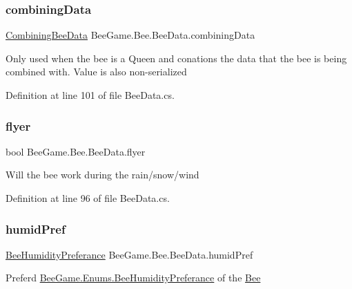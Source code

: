 \subsubsection{\texorpdfstring{combining\+Data}{combiningData}}
{\footnotesize\ttfamily \hyperlink{struct_bee_game_1_1_bee_1_1_combining_bee_data}{Combining\+Bee\+Data} Bee\+Game.\+Bee.\+Bee\+Data.\+combining\+Data}



Only used when the bee is a Queen and conations the data that the bee is being combined with. Value is also non-\/serialized 



Definition at line 101 of file Bee\+Data.\+cs.

\mbox{\label{struct_bee_game_1_1_bee_1_1_bee_data_af78a352321613693c3e94c98f655ac63}} 
\subsubsection{\texorpdfstring{flyer}{flyer}}
{\footnotesize\ttfamily bool Bee\+Game.\+Bee.\+Bee\+Data.\+flyer}



Will the bee work during the rain/snow/wind 



Definition at line 96 of file Bee\+Data.\+cs.

\mbox{\label{struct_bee_game_1_1_bee_1_1_bee_data_a6b786e9cb8f5bbf7b6d1a16d7c7eb37e}} 
\subsubsection{\texorpdfstring{humid\+Pref}{humidPref}}
{\footnotesize\ttfamily \hyperlink{namespace_bee_game_1_1_enums_a66566cbc9da8d1d1e402156b4bd3bf9d}{Bee\+Humidity\+Preferance} Bee\+Game.\+Bee.\+Bee\+Data.\+humid\+Pref}



Preferd \hyperlink{namespace_bee_game_1_1_enums_a66566cbc9da8d1d1e402156b4bd3bf9d}{Bee\+Game.\+Enums.\+Bee\+Humidity\+Preferance} of the \hyperlink{namespace_bee_game_1_1_bee}{Bee} 



